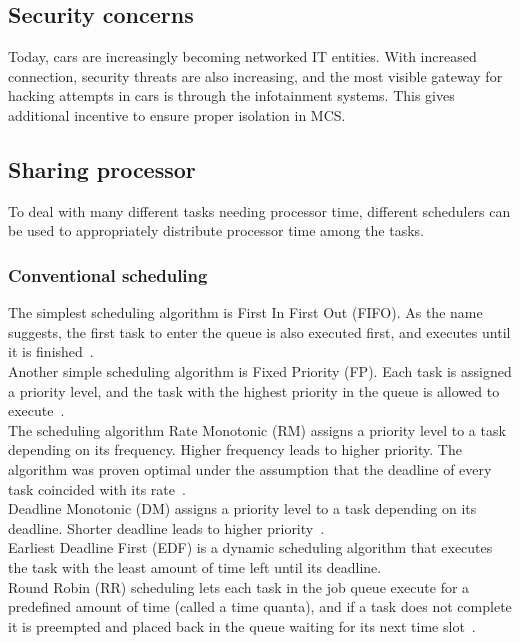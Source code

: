 \subsection{Security concerns}
Today, cars are increasingly becoming networked IT entities. With increased connection, security threats are also increasing, and the most visible gateway for hacking attempts in cars is through the infotainment systems. This gives additional incentive to ensure proper isolation in MCS.

\subsection{Sharing processor}
To deal with many different tasks needing processor time, different schedulers can be used to appropriately distribute processor time among the tasks.

\subsubsection{Conventional scheduling}
The simplest scheduling algorithm is First In First Out (FIFO). As the name suggests, the first task to enter the queue is also executed first, and executes until it is finished~\cite{remzi2015}.\\

Another simple scheduling algorithm is Fixed Priority (FP). Each task is assigned a priority level, and the task with the highest priority in the queue is allowed to execute~\cite{liulayland1973}.\\

The scheduling algorithm Rate Monotonic (RM) assigns a priority level to a task depending on its frequency. Higher frequency leads to higher priority. The algorithm was proven optimal under the assumption that the deadline of every task coincided with its rate~\cite{liulayland1973}.\\

Deadline Monotonic (DM) assigns a priority level to a task depending on its deadline. Shorter deadline leads to higher priority~\cite{liulayland1973}.\\

Earliest Deadline First (EDF) is a dynamic scheduling algorithm that executes the task with the least amount of time left until its deadline.\\

Round Robin (RR) scheduling lets each task in the job queue execute for a predefined amount of time (called a time quanta), and if a task does not complete it is preempted and placed back in the queue waiting for its next time slot~\cite{kleinrock1964}.

